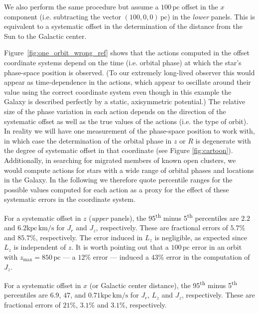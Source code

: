 \documentclass[twocolumn]{aastex62}
\newcommand{\pc}{\text{pc}}
\newcommand{\kms}{\text{km}/\text{s}}
\newcommand{\actunit}{\text{kpc}\,\kms}
\begin{document}
We also perform the same procedure but assume a $100\,\pc$ offset in the $x$
    component (i.e. subtracting the vector $(100, 0, 0)\,\pc$) in the {\em
    lower} panels. This is equivalent to a systematic offset in the
    determination of the distance from the Sun to the Galactic center.

Figure~\ref{fig:one_orbit_wrong_ref} shows that the actions computed in the
offset coordinate systems depend on the time (i.e. orbital phase) at which the
star's phase-space position is observed. (To our extremely long-lived observer
this would appear as time-dependence in the actions, which appear to oscillate
around their value using the correct coordinate system even though in this
example the Galaxy is described perfectly by a static, axisymmetric
potential.) The relative size of the phase variation in each action depends on
the direction of the systematic offset as well as the true values of the
actions (i.e. the type of orbit). In reality we will have one measurement of
the phase-space position to work with, in which case the determination of the
orbital phase in $z$ or $R$ is degenerate with the degree of systematic offset
in that coordinate (see Figure \ref{fig:cartoon}). Additionally, in searching
for migrated members of known open clusters, we would compute actions for
stars with a wide range of orbital phases and locations in the Galaxy. In the
following we therefore quote percentile ranges for the possible values
computed for each action as a proxy for the effect of these systematic errors
in the coordinate system.

For a systematic offset in $z$ ({\em upper} panels), the
95\textsuperscript{th} minus 5\textsuperscript{th} percentiles are $2.2$ and
$6.2 \actunit$ for $J_r$ and $J_z$, respectively. These are fractional errors
of $5.7\%$ and $85.7\%$, respectively. The error induced in $L_z$ is
negligible, as expected since $L_z$ is independent of $z$. It is worth
pointing out that a $100\,\pc$ error in an orbit with
$z_{\text{max}}=850\,\pc$ --- a $12\%$ error
--- induced a $43\%$ error in the computation of $J_z$.

For a systematic offset in $x$ (or Galactic center distance), the
95\textsuperscript{th} minus 5\textsuperscript{th} percentiles are $6.9$,
$47$, and $0.71 \actunit$ for $J_r$, $L_z$ and $J_z$, respectively. These are
fractional errors of $21\%$, $3.1\%$ and $3.1\%$, respectively.
\end{document}
